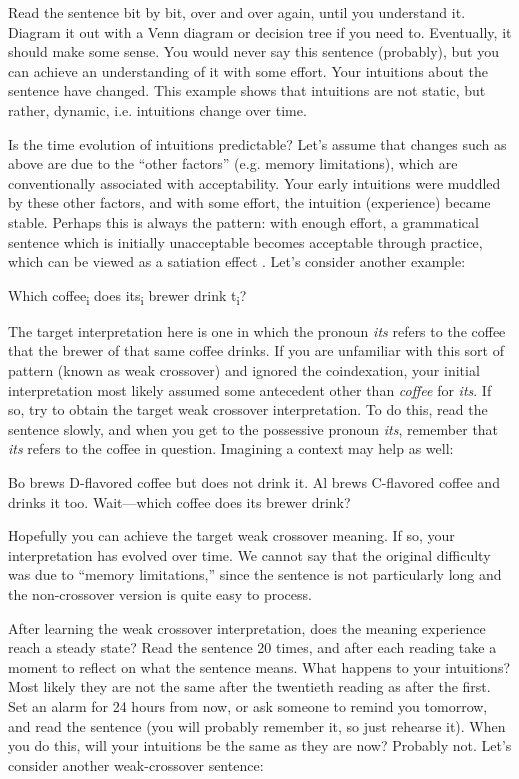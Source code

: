   Read the sentence bit by bit, over and over again, until you understand it. Diagram it out with a Venn diagram or decision tree if you need to. Eventually, it should make some sense. You would never say this sentence (probably), but you can achieve an understanding of it with some effort. Your intuitions about the sentence have changed. This example shows that intuitions are not static, but rather, dynamic, i.e. intuitions change over time.

  Is the time evolution of intuitions predictable? Let's assume that changes such as above are due to the “other factors” (e.g. memory limitations), which are conventionally associated with acceptability. Your early intuitions were muddled by these other factors, and with some effort, the intuition (experience) became stable. Perhaps this is always the pattern: with enough effort, a grammatical sentence which is initially unacceptable becomes acceptable through practice, which can be viewed as a satiation effect \citep{Snyder2000}. Let's consider another example:

\ea
Which coffee\textsubscript{i} does its\textsubscript{i} brewer drink t\textsubscript{i}?
\z

  The target interpretation here is one in which the pronoun \textit{its} refers to the coffee that the brewer of that same coffee drinks. If you are unfamiliar with this sort of pattern (known as weak crossover) and ignored the coindexation, your initial interpretation most likely assumed some antecedent other than \textit{coffee} for \textit{its}. If so, try to obtain the target weak crossover interpretation. To do this, read the sentence slowly, and when you get to the possessive pronoun \textit{its}, remember that \textit{its} refers to the coffee in question. Imagining a context may help as well:

\ea
\begin{exe}
  {Bo brews D-flavored coffee but does not drink it. Al brews C-flavored coffee and drinks it too.} 
  {Wait—which coffee does its brewer drink?}
\end{exe}
\z

  Hopefully you can achieve the target weak crossover meaning. If so, your interpretation has evolved over time. We cannot say that the original difficulty was due to “memory limitations,” since the sentence is not particularly long and the non-crossover version is quite easy to process. 

  After learning the weak crossover interpretation, does the meaning experience reach a steady state? Read the sentence 20 times, and after each reading take a moment to reflect on what the sentence means. What happens to your intuitions? Most likely they are not the same after the twentieth reading as after the first. Set an alarm for 24 hours from now, or ask someone to remind you tomorrow, and read the sentence (you will probably remember it, so just rehearse it). When you do this, will your intuitions be the same as they are now? Probably not. Let's consider another weak-crossover sentence: 

